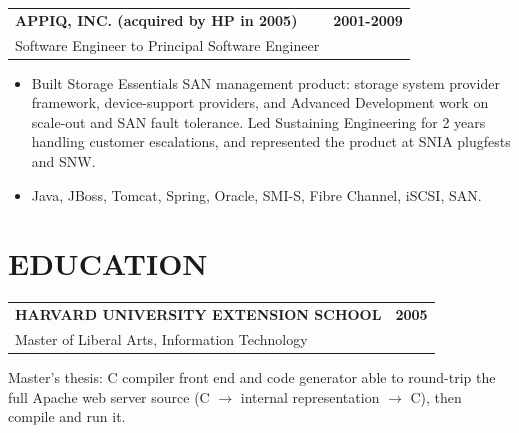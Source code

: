 \documentclass[11pt]{article}
\makeatletter
\newcommand{\resheader}[1]{\section*{#1}\vspace{-4pt}}
\newcommand{\jobheading}[4]{%
  \vspace{4pt}\begin{tabularx}{\textwidth}{@{}X r@{}}
    {\textbf{#1}} & {\textbf{#2}} \\
    {{\normalsize #3}\hspace{0.5em}{\color{muted}·}\hspace{0.5em}{\color{muted}#4}} & {} \\
  \end{tabularx}\vspace{0pt}
}
\makeatother
\begin{document}
\jobheading{APPIQ, INC. (acquired by HP in 2005)}{2001-2009}{Software Engineer to Principal Software Engineer}{Marlborough, MA}
\begin{itemize}
\item Built Storage Essentials SAN management product: storage system provider framework, device-support providers, and Advanced Development work on scale-out and SAN fault tolerance. Led Sustaining Engineering for 2 years handling customer escalations, and represented the product at SNIA plugfests and SNW.
\item Java, JBoss, Tomcat, Spring, Oracle, SMI-S, Fibre Channel, iSCSI, SAN.
\end{itemize}

\resheader{EDUCATION}

\jobheading{HARVARD UNIVERSITY EXTENSION SCHOOL}{2005}{Master of Liberal Arts, Information Technology}{Cambridge, MA}

Master's thesis: C compiler front end and code generator able to round-trip the full Apache web server source (C $\to$ internal representation $\to$ C), then compile and run it.
\end{document}
